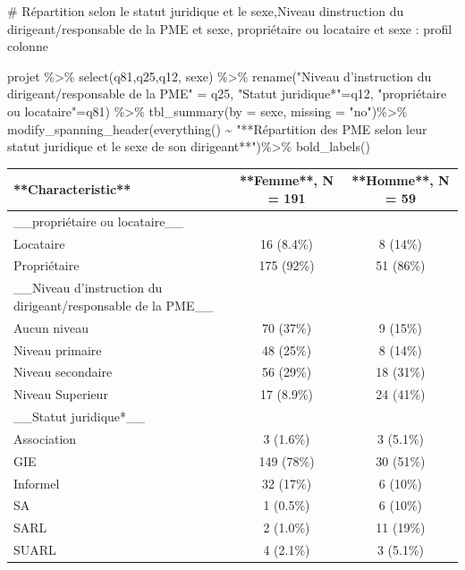 \documentclass[
  letterpaper,
  DIV=11,
  numbers=noendperiod]{scrartcl}
\newenvironment{Shaded}{\begin{snugshade}}{\end{snugshade}}
\newcommand{\AttributeTok}[1]{\textcolor[rgb]{0.40,0.45,0.13}{#1}}
\newcommand{\CommentTok}[1]{\textcolor[rgb]{0.37,0.37,0.37}{#1}}
\newcommand{\FunctionTok}[1]{\textcolor[rgb]{0.28,0.35,0.67}{#1}}
\newcommand{\NormalTok}[1]{\textcolor[rgb]{0.00,0.23,0.31}{#1}}
\newcommand{\OtherTok}[1]{\textcolor[rgb]{0.00,0.23,0.31}{#1}}
\newcommand{\SpecialCharTok}[1]{\textcolor[rgb]{0.37,0.37,0.37}{#1}}
\newcommand{\StringTok}[1]{\textcolor[rgb]{0.13,0.47,0.30}{#1}}
\begin{document}
\begin{Shaded}
\begin{Highlighting}[]
\CommentTok{\# Répartition selon le statut juridique et le sexe,Niveau d\textquotesingle{}instruction du dirigeant/responsable de la PME et sexe, propriétaire ou locataire et sexe : profil colonne}

\NormalTok{projet }\SpecialCharTok{\%\textgreater{}\%}
     \FunctionTok{select}\NormalTok{(q81,q25,q12, sexe) }\SpecialCharTok{\%\textgreater{}\%}
       \FunctionTok{rename}\NormalTok{(}\StringTok{"Niveau d’instruction du dirigeant/responsable de la PME"} \OtherTok{=}\NormalTok{ q25, }
         \StringTok{"Statut juridique*"}\OtherTok{=}\NormalTok{q12, }\StringTok{"propriétaire ou locataire"}\OtherTok{=}\NormalTok{q81) }\SpecialCharTok{\%\textgreater{}\%} 
            \FunctionTok{tbl\_summary}\NormalTok{(}\AttributeTok{by =}\NormalTok{ sexe, }\AttributeTok{missing =} \StringTok{"no"}\NormalTok{)}\SpecialCharTok{\%\textgreater{}\%}
              \FunctionTok{modify\_spanning\_header}\NormalTok{(}\FunctionTok{everything}\NormalTok{() }\SpecialCharTok{\textasciitilde{}} \StringTok{"**Répartition des PME selon leur statut juridique et le sexe de son dirigeant**"}\NormalTok{)}\SpecialCharTok{\%\textgreater{}\%} 
                   \FunctionTok{bold\_labels}\NormalTok{()}
\end{Highlighting}
\end{Shaded}

\begin{tabular}{l|c|c}
\hline
**Characteristic** & **Femme**, N = 191 & **Homme**, N = 59\\
\hline
\_\_propriétaire ou locataire\_\_ &  & \\
\hline
Locataire & 16 (8.4\%) & 8 (14\%)\\
\hline
Propriétaire & 175 (92\%) & 51 (86\%)\\
\hline
\_\_Niveau d’instruction du dirigeant/responsable de la PME\_\_ &  & \\
\hline
Aucun niveau & 70 (37\%) & 9 (15\%)\\
\hline
Niveau primaire & 48 (25\%) & 8 (14\%)\\
\hline
Niveau secondaire & 56 (29\%) & 18 (31\%)\\
\hline
Niveau Superieur & 17 (8.9\%) & 24 (41\%)\\
\hline
\_\_Statut juridique*\_\_ &  & \\
\hline
Association & 3 (1.6\%) & 3 (5.1\%)\\
\hline
GIE & 149 (78\%) & 30 (51\%)\\
\hline
Informel & 32 (17\%) & 6 (10\%)\\
\hline
SA & 1 (0.5\%) & 6 (10\%)\\
\hline
SARL & 2 (1.0\%) & 11 (19\%)\\
\hline
SUARL & 4 (2.1\%) & 3 (5.1\%)\\
\hline
\end{tabular}
\end{document}
